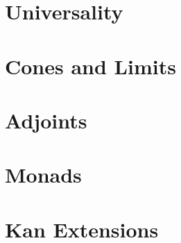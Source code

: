 \documentclass[12pt, a4paper, oneside, openright, titlepage]{book}
\begin{document}
\chapter{Universality}


\chapter{Cones and Limits}



\chapter{Adjoints}


\chapter{Monads}



\chapter{Kan Extensions}



\begin{appendices}

\end{appendices}
\end{document}
